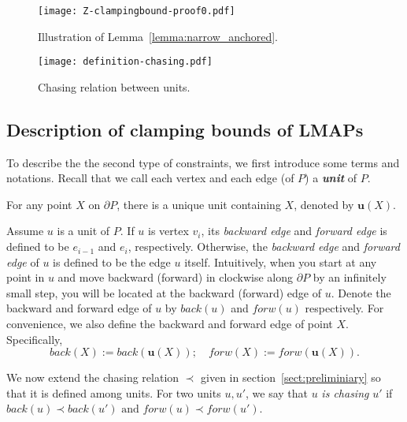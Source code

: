 \documentclass{ws-ijcga}
\begin{document}
\begin{figure}[h]
\begin{minipage}[b]{.48\textwidth}
  \centering\texttt{[image: Z-clampingbound-proof0.pdf]}
  \caption{Illustration of Lemma~\ref{lemma:narrow_anchored}.}\label{fig:PC0}
\end{minipage}
\begin{minipage}[b]{.48\textwidth}
  \centering\texttt{[image: definition-chasing.pdf]}
  \caption{Chasing relation between units.}\label{fig:chasing-u}
\end{minipage}
\end{figure}

\subsection{Description of clamping bounds of LMAPs}\label{subsect:clamping-description}

\newcommand{\unit}{\mathbf{u}}
To describe the the second type of constraints, we first introduce some terms and notations.
Recall that we call each vertex and each edge (of $P$) a \emph{\textbf{unit}} of $P$.

For any point $X$ on $\partial P$, there is a unique unit containing $X$, denoted by $\unit(X)$.

\begin{definition}\label{def:units}
Assume $u$ is a unit of $P$.
If $u$ is vertex $v_i$, its \emph{backward edge} and \emph{forward edge} is defined to be $e_{i-1}$ and $e_i$, respectively.
Otherwise, the \emph{backward edge} and \emph{forward edge} of $u$ is defined to be the edge $u$ itself.
Intuitively, when you start at any point in $u$ and move backward (forward) in clockwise along $\partial P$ by an infinitely small step, you will be located at the backward (forward) edge of $u$.
Denote the backward and forward edge of $u$ by $back(u)$ and $forw(u)$ respectively.
For convenience, we also define the backward and forward edge of point $X$. Specifically,
$$back(X):=back(\unit(X)); \quad forw(X):=forw(\unit(X)).$$
\end{definition}

\begin{definition}
 We now extend the chasing relation $\prec$ given in section~\ref{sect:preliminiary} so that it is defined among units.
For two units $u,u'$, we say that $u$ \emph{is chasing} $u'$ if $back(u)\prec back(u')\text{ and }forw(u)\prec forw(u')$.
\end{definition}
\end{document}
